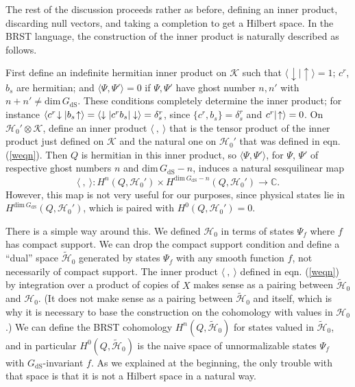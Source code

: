 \documentclass[11pt,a4paper]{article}
\def\t{{ \sf t}}
\def\dim{{\mathrm{dim}}}
\def\be{\begin{equation}}
\def\ee{\end{equation}}
\def\K{{\mathcal K}}
\def\C{{\mathbb C}}
\def\t{\widetilde }
\def\H{{\mathcal H}}
\def\dS{{\mathrm{dS}}}
\def\la{\langle}
\def\ra{\rangle}
\begin{document}
The rest of the discussion proceeds  rather as before, defining an inner product, discarding null vectors, and taking a completion to get a Hilbert space.   In the BRST
language, the construction of the inner product is naturally described as follows.    


First
 define an indefinite  hermitian inner product on $\K$ such that $\la\downarrow|\uparrow\ra=1$; $c^r$, $b_s$ are hermitian;
and $\la\Psi,\Psi'\ra=0$ if $\Psi,\Psi'$ have ghost number $n,n'$ with $n+n'\not= \dim\,G_\dS$.
These conditions completely determine the inner product; for instance $\la c^r \negthinspace\downarrow| b_s\negthinspace\uparrow\ra=\la\downarrow|c^r b_s|\downarrow\ra=\delta^r_s$, since
$\{c^r,b_s\}=\delta^r_s$ and $c^r|\negthinspace\uparrow\ra=0$.     
On $\H_0'\otimes \K$, define an inner product  $\la~,~\ra$ that is the  tensor product of the inner product just defined on $\K$ and the natural one on $\H_0'$ that was defined in eqn. (\ref{weqn}).
Then $Q$ is hermitian in this inner product, so  $\la\Psi,\Psi'\ra$, for $\Psi$, $\Psi'$ of respective ghost numbers $n$ and $\dim\,G_\dS-n$, induces a natural
sesquilinear  map 
\be\label{zimbox} \la~,~\ra:H^n(Q,\H_0')\times H^{\dim\,G_\dS-n}(Q,\H_0')\to \C.\ee    However, this map is not very useful for our purposes, since physical states
lie in $H^{\dim\,G_\dS}(Q,\H_0')$, which is paired with $H^0(Q,\H_0')=0$.  

There is a simple way around this.   We defined $\H_0$ in terms of states $\Psi_f$ where $f$ has compact support.  We can drop the compact support
condition and define a ``dual'' space $\t\H_0$ generated by states $\Psi_f$ with any smooth function $f$, not necessarily of compact support.
The inner product $\la~,~\ra$ defined in eqn. (\ref{weqn})  by integration over a product of copies of $X$ makes sense as a pairing between $\t\H_0$ and $\H_0$.
(It does not make sense as a pairing between $\t\H_0$ and itself, which is why it is necessary to base the construction on the cohomology with values in $\H_0$.)  
We can define the BRST cohomology $H^n(Q,\t\H_0)$ for states valued in $\t\H_0$, and in particular $H^0(Q,\t\H_0)$ is the naive space of  unnormalizable
states $\Psi_f$ with $G_\dS$-invariant
$f$.  As we explained at the beginning, the only trouble with that space is that it is not a Hilbert space in a natural way.  
\end{document}
